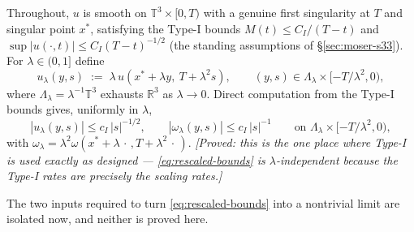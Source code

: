 \documentclass[11pt]{article}
\theoremstyle{definition}
\theoremstyle{remark}
\newcommand{\R}{\mathbb{R}}
\newcommand{\T}{\mathbb{T}}
\begin{document}
Throughout, $u$ is smooth on $\T^3\times[0,T)$ with a genuine first
singularity at $T$ and singular point $x^*$, satisfying the Type-I bounds
$M(t)\leq C_I/(T-t)$ and $\sup|u(\cdot,t)|\leq C_I(T-t)^{-1/2}$ (the standing
assumptions of \S\ref{sec:moser-s33}). For $\lambda\in(0,1]$ define
\begin{equation}\label{eq:rescaling}
  u_\lambda(y,s) \;:=\; \lambda\,u(x^*+\lambda y,\ T+\lambda^2 s),
  \qquad (y,s)\in \Lambda_\lambda\times[-T/\lambda^2,0),
\end{equation}
where $\Lambda_\lambda = \lambda^{-1}\T^3$ exhausts $\R^3$ as
$\lambda\to0$. Direct computation from the Type-I bounds gives, uniformly in
$\lambda$,
\begin{equation}\label{eq:rescaled-bounds}
  |u_\lambda(y,s)| \leq c_I\,|s|^{-1/2},
  \qquad
  |\omega_\lambda(y,s)| \leq c_I\,|s|^{-1}
  \qquad\text{on }\Lambda_\lambda\times[-T/\lambda^2,0),
\end{equation}
with $\omega_\lambda = \lambda^2\omega(x^*+\lambda\,\cdot\,,T+\lambda^2\,\cdot\,)$.
\emph{[Proved: this is the one place where Type-I is used exactly as
designed --- \eqref{eq:rescaled-bounds} is $\lambda$-independent because the
Type-I rates are precisely the scaling rates.]}

The two inputs required to turn \eqref{eq:rescaled-bounds} into a nontrivial
limit are isolated now, and neither is proved here.
\end{document}
